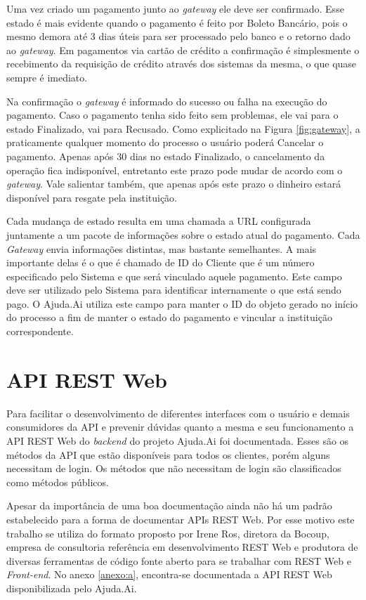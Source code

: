 Uma vez criado um pagamento junto ao \emph{gateway} ele deve ser confirmado. Esse estado é mais evidente quando o pagamento é feito por Boleto Bancário, pois o mesmo demora até 3 dias úteis para ser processado pelo banco e o retorno dado ao \emph{gateway}. Em pagamentos via cartão de crédito a confirmação é simplesmente o recebimento da requisição de crédito através dos sistemas da mesma, o que quase sempre é imediato.

Na confirmação o \emph{gateway} é informado do sucesso ou falha na execução do pagamento. Caso o pagamento tenha sido feito sem problemas, ele vai para o estado Finalizado, vai para Recusado. Como explicitado na Figura \ref{fig:gateway}, a praticamente qualquer momento do processo o usuário poderá Cancelar o pagamento. Apenas após 30 dias no estado Finalizado, o cancelamento da operação fica indisponível, entretanto este prazo pode mudar de acordo com o \emph{gateway}. Vale salientar também, que apenas após este prazo o dinheiro estará disponível para resgate pela instituição.

Cada mudança de estado resulta em uma chamada a URL configurada juntamente a um pacote de informações sobre o estado atual do pagamento. Cada \emph{Gateway} envia informações distintas, mas bastante semelhantes. A mais importante delas é o que é chamado de ID do Cliente que é um número especificado pelo Sistema e que será vinculado aquele pagamento. Este campo deve ser utilizado pelo Sistema para identificar internamente o que está sendo pago. O Ajuda.Ai utiliza este campo para manter o ID do objeto  gerado no início do processo a fim de manter o estado do pagamento e vincular a instituição correspondente.





\section{API REST Web} \label{sec:ajudaai:api}

Para facilitar o desenvolvimento de diferentes interfaces com o usuário e demais consumidores da API e prevenir dúvidas quanto a mesma e seu funcionamento a API REST Web do \emph{backend} do projeto Ajuda.Ai foi documentada. Esses são os métodos da API que estão disponíveis para todos os clientes, porém alguns necessitam de login. Os métodos que não necessitam de login são classificados como métodos públicos.

Apesar da importância de uma boa documentação ainda não há um padrão estabelecido para a forma de documentar APIs REST Web. Por esse motivo este trabalho se utiliza do formato proposto por Irene Ros\cite{blog:bocoup}, diretora da Bocoup, empresa de consultoria referência em desenvolvimento REST Web e produtora de diversas ferramentas de código fonte aberto para se trabalhar com REST Web e \emph{Front-end}. No anexo \ref{anexo:a}, encontra-se documentada a API REST Web disponibilizada pelo Ajuda.Ai.






